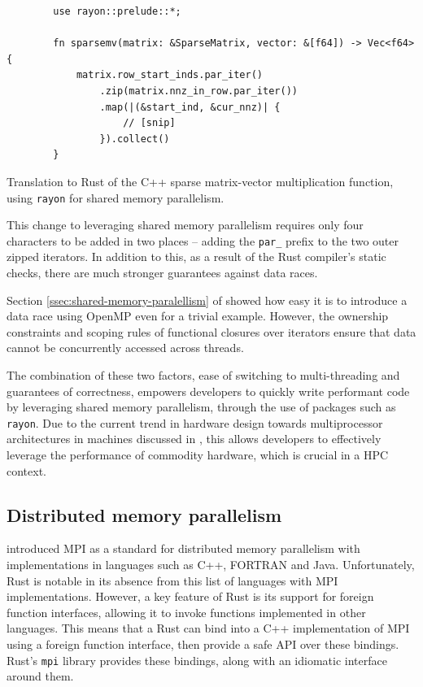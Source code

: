 \begin{listing}[H]
    \begin{verbatim}
        use rayon::prelude::*;
        
        fn sparsemv(matrix: &SparseMatrix, vector: &[f64]) -> Vec<f64> {
            matrix.row_start_inds.par_iter()
                .zip(matrix.nnz_in_row.par_iter())
                .map(|(&start_ind, &cur_nnz)| {
                    // [snip]
                }).collect()
        }
    \end{verbatim}
    \caption{Translation to Rust of the C++ sparse matrix-vector multiplication function, using \texttt{rayon} for shared memory parallelism.}
    \label{listing:rust-sparsemv-rayon}
\end{listing}

This change to leveraging shared memory parallelism requires only four characters to be added in two places -- adding the \texttt{par\_} prefix to the two outer zipped iterators. In addition to this, as a result of the Rust compiler's static checks, there are much stronger guarantees against data races.

Section \ref{ssec:shared-memory-paralellism} of  showed how easy it is to introduce a data race using OpenMP even for a trivial example. However, the ownership constraints and scoping rules of functional closures over iterators ensure that data cannot be concurrently accessed across threads.

The combination of these two factors, ease of switching to multi-threading and guarantees of correctness, empowers developers to quickly write performant code by leveraging shared memory parallelism, through the use of packages such as \texttt{rayon}. Due to the current trend in hardware design towards multiprocessor architectures in machines discussed in , this allows developers to effectively leverage the performance of commodity hardware, which is crucial in a \acrshort{HPC} context.

\subsection{Distributed memory parallelism}
\label{sec:translation-mpi}

 introduced MPI as a standard for distributed memory parallelism with implementations in languages such as C++, FORTRAN and Java. Unfortunately, Rust is notable in its absence from this list of languages with MPI implementations. However, a key feature of Rust is its support for foreign function interfaces, allowing it to invoke functions implemented in other languages. This means that a Rust can bind into a C++ implementation of MPI using a foreign function interface, then provide a safe API over these bindings. Rust's \texttt{mpi} library \cite{noauthor_rsmpirsmpi_2024} %
provides these bindings, along with an idiomatic interface around them.


